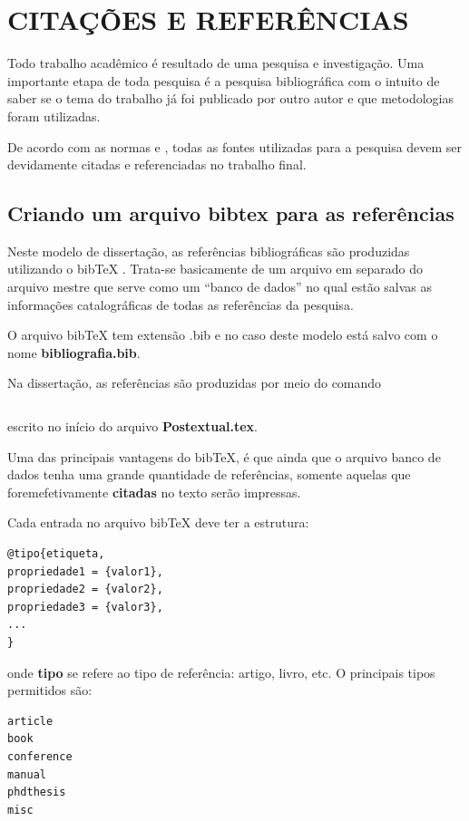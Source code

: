 
\chapter{CITAÇÕES E REFERÊNCIAS}

Todo trabalho acadêmico é resultado de uma pesquisa e investigação. Uma importante etapa de toda pesquisa é a pesquisa bibliográfica com o intuito de saber se o tema do trabalho já foi publicado por outro autor e que metodologias foram utilizadas.

De acordo com as normas   e , todas as fontes utilizadas para a pesquisa devem ser devidamente citadas e referenciadas no trabalho final.


\section{Criando um arquivo bibtex para as referências}


Neste modelo de dissertação, as referências bibliográficas são produzidas utilizando o bibTeX \cite{bibtex-org}. Trata-se basicamente de um arquivo em separado do arquivo mestre que serve como um ``banco de dados'' no qual estão salvas as informações catalográficas de todas as referências da pesquisa. 

O arquivo bibTeX tem extensão .bib e no caso deste modelo está salvo com o nome \textbf{bibliografia.bib}.

Na dissertação, as referências são produzidas por meio do comando 
\begin{verbatim}

\end{verbatim}
escrito no início do arquivo \textbf{Postextual.tex}.

Uma das principais vantagens do bibTeX, é que ainda que o arquivo banco de dados tenha uma grande quantidade de referências, somente aquelas que foremefetivamente \textbf{citadas} no texto serão impressas.

Cada entrada no arquivo bibTeX deve ter a estrutura:
\begin{verbatim}
@tipo{etiqueta,
propriedade1 = {valor1},
propriedade2 = {valor2},
propriedade3 = {valor3},
...
}
\end{verbatim}
onde \textbf{tipo} se refere ao tipo de referência: artigo, livro, etc. O principais tipos permitidos são:
\begin{verbatim}
article
book
conference
manual
phdthesis
misc
\end{verbatim}

